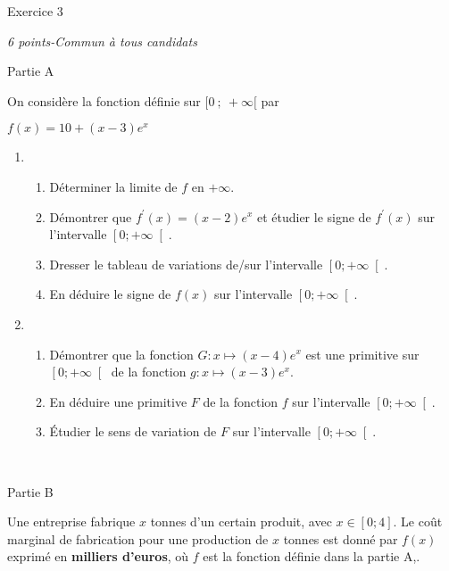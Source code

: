 
%
\begin{h2}Exercice 3\end{h2}
\textit{6 points-Commun à tous candidats }
\begin{h3}Partie A\end{h3}
On considère la fonction définie sur $ [ 0~;~+\infty [ $ par

\begin{center}
$f\left(x\right)= 10+\left(x-3\right)e^{x}$
\end{center}

\begin{enumerate}
     \item
     \begin{enumerate}[label=\alph*.]
          \item
          Déterminer la limite de $f$ en $+ \infty $.
          \item
          Démontrer que $f^{\prime}\left(x\right)=\left(x-2\right)e^{x}$ et étudier le signe de $f^{\prime}\left(x\right)$ sur l'intervalle $\left[0  ; +\infty \right[$.
          \item
          Dresser le tableau de variations de/sur l'intervalle $\left[0  ; +\infty \right[$.
          \item
          En déduire le signe de $f\left(x\right)$ sur l'intervalle $\left[0  ; +\infty \right[$.
     \end{enumerate}
     \item
     \begin{enumerate}[label=\alph*.]
          \item
          Démontrer que la fonction $G : x \mapsto   \left(x-4 \right)e^{x}$ est une primitive sur $\left[0  ; +\infty \right[$ de la fonction $g : x \mapsto  \left(x-3 \right)e^{x}$.
          \item
          En déduire une primitive $F$ de la fonction $f$ sur l'intervalle $\left[0  ; +\infty \right[$.
          \item
          Étudier le sens de variation de $F$ sur l'intervalle $\left[0  ; +\infty \right[$.
     \end{enumerate}
\end{enumerate}
 
\begin{h3}Partie B\end{h3}
Une entreprise fabrique $x$ tonnes d'un certain produit, avec $x\in \left[0  ; 4\right]$. Le coût marginal de fabrication pour une production de $x$ tonnes est donné par $f\left(x\right)$ exprimé en \textbf{milliers d'euros}, où $f$ est la fonction définie dans la partie A,.
